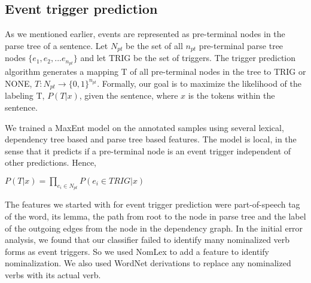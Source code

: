 \subsection{Event trigger prediction}
As we mentioned earlier, events are represented as pre-terminal nodes in the parse tree of a sentence. Let $N_{pt}$ be the set of all $n_{pt}$ pre-terminal parse tree nodes $\{e_1, e_2, ... e_{n_{pt}}\}$ and let TRIG be the set of triggers. The trigger prediction algorithm generates a mapping T of all pre-terminal nodes in the tree to TRIG or NONE, $T : N_{pt} \rightarrow \{0,1\}^{n_{pt}}$. Formally, our goal is to maximize the likelihood of the labeling T,  $P(T | x)$, given the sentence, where $x$ is the tokens within the sentence.

We trained a MaxEnt model on the annotated samples using several lexical, dependency tree based and parse tree based features. The model is local, in the sense that it predicts if a pre-terminal node is an event trigger independent of other predictions. Hence, 

$P(T | x) = \prod_{e_{i}\in N_{pt}} P(e_{i} \in TRIG | x) $

The features we started with for event trigger prediction were part-of-speech tag of the word, its lemma, the path from root to the node in parse tree and the label of the outgoing edges from the node in the dependency graph. In the initial error analysis, we found that our classifier failed to identify many nominalized verb forms as event triggers. So we used NomLex to add a feature to identify nominalization. We also used WordNet derivations to replace any nominalized verbs with its actual verb.